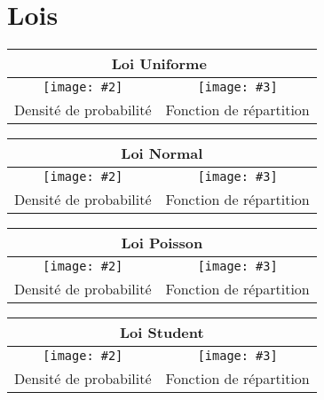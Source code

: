 \section{Lois}


\newcommand{\createTabularLoi}[3]{
\begin{tabular}{|c|c|}

    \hline
    \multicolumn{2}{|c|}{#1}\\
    \hline
    \texttt{[image: \#2]}&\texttt{[image: \#3]}\\
    Densité de probabilité & Fonction de répartition\\
    \hline

\end{tabular}}

\begin{center}
    \createTabularLoi{Loi Uniforme $$ }{1.lois/uniform_probability_density_function.pdf}{1.lois/uniform_cumulative_distribution_function.pdf}

    \createTabularLoi{Loi Normal}{1.lois/normal_probability_density_function.pdf}{1.lois/normal_cumulative_distribution_function.pdf}
    
    \createTabularLoi{Loi Poisson}{1.lois/poisson_probability_density_function.pdf}{1.lois/poisson_cumulative_distribution_function.pdf}
    
    \createTabularLoi{Loi Student}{1.lois/student_probability_density_function.pdf}{1.lois/student_cumulative_distribution_function.pdf}
    
\end{center}


